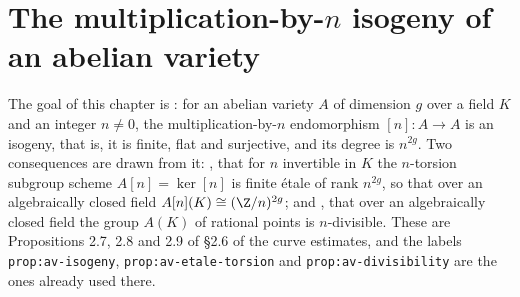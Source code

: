 %

\chapter{The multiplication-by-$n$ isogeny of an abelian variety}
\label{chap:av-isogeny}

The goal of this chapter is : for an abelian variety $A$
of dimension $g$ over a field $K$ and an integer $n\neq0$, the
multiplication-by-$n$ endomorphism $[n]\colon A\to A$ is an isogeny, that is, it
is finite, flat and surjective, and its degree is $n^{2g}$.  Two consequences
are drawn from it: , that for $n$ invertible in $K$
the $n$-torsion subgroup scheme $A[n]=\ker[n]$ is finite \'etale of rank
$n^{2g}$, so that over an algebraically closed field
$A[n](K)\cong(\Z/n)^{2g}$; and , that over an
algebraically closed field the group $A(K)$ of rational points is
$n$-divisible.  These are Propositions 2.7, 2.8 and 2.9 of \S2.6 of the curve
estimates, and the labels \texttt{prop:av-isogeny},
\texttt{prop:av-etale-torsion} and \texttt{prop:av-divisibility} are the ones
already used there.

